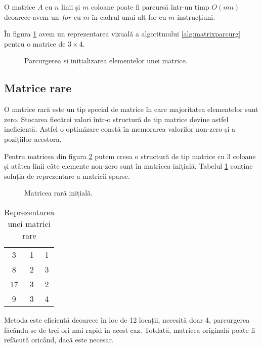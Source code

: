 O matrice $A$ cu $n$ linii și $m$ coloane poate fi parcursă într-un timp $O(mn)$ deoarece avem un $for$ cu $m$ în cadrul unui alt for cu $m$ instrucțiuni.

În figura \ref{fig:parcurgmatrix} avem un reprezentarea vizuală a algoritmului 
\ref{alg:matrixparcurg} pentru o matrice de $3\times4$.
\begin{figure}[H] 
	\centering	
	{
	}
	\caption{Parcurgerea și inițializarea elementelor unei matrice.} 
	\label{fig:parcurgmatrix}
\end{figure}


\subsection{Matrice rare}

O matrice rară este un tip special de matrice în care majoritatea elementelor sunt zero. Stocarea fiecărei valori într-o structură de tip matrice devine astfel ineficientă. Astfel o optimizare constă în memorarea valorilor non-zero și a pozițiilor acestora.

Pentru matricea din figura \ref{fig:sparse} putem creea o structură de tip matrice cu 3 coloane și atâtea linii câte elemente non-zero sunt în matricea inițială. Tabelul \ref{table:sparse} conține soluția de reprezentare a matricii sparse.

\begin{figure}[H] 
	\centering	
	{
	}
	\caption{Matricea rară inițială.} 
	\label{fig:sparse}
\end{figure}



\begin{table}[h]
	\centering
	\begin{tabular}{ c c c }
		3 & 1 & 1 \\ 
		8 & 2 & 3 \\  
		17 & 3 & 2 \\    	
		9 & 3 & 4 
	\end{tabular}
	\caption{Reprezentarea unei matrici rare}
	\label{table:sparse}
\end{table}

Metoda este eficientă deoarece în loc de 12 locații, necesită doar 4, parcurgerea făcându-se de trei ori mai rapid în acest caz. Totdată, matricea originală poate fi refăcută oricând, dacă este necesar.

\newpage


